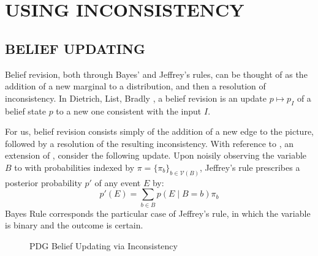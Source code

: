 \documentclass{article}
\def\sheq{\!=\!}
\newcommand{\V}{\mathcal V}
\numberwithin{equation}{section}
\begin{document}
	

	\section{USING INCONSISTENCY}	
	\subsection{BELIEF UPDATING} \label{sec:belief-update}
	Belief revision, both through Bayes' and Jeffrey's rules, can be thought of as the addition of a new marginal to a distribution, and then a resolution of inconsistency. In Dietrich, List, Bradly \cite{dietrich2016belief}, a belief revision is an update $p \mapsto p_I$ of a belief state $p$ to a new one consistent with the input $I$. 
	
	For us, belief revision consists simply of the addition of a new edge to the picture, followed by a resolution of the resulting inconsistency. 
	With reference to , an extension of , consider the following update. 
	Upon noisily observing the variable $B$ to with probabilities indexed by $\pi = \{\pi_b\}_{b \in \V(B)}$, Jeffrey's rule prescribes a posterior probability $p'$ of any event $E$ by:
	\[ p'(E) = \sum_{b \in B} p(E \mid B\sheq b) \pi_b \]
	Bayes Rule corresponds the particular case of Jeffrey's rule, in which the variable is binary and the outcome is certain.

	
	\begin{figure}[htb]
		\centering
%				
%				
		\caption{PDG Belief Updating via Inconsistency}
		\label{fig:belief-update}
	\end{figure}
	
\end{document}
